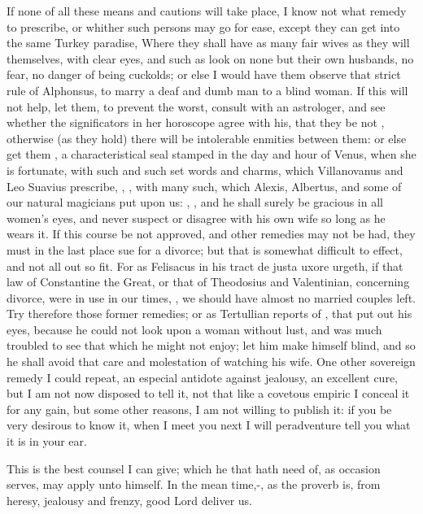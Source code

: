 If none of all these means and cautions will take place, I know not
what remedy to prescribe, or whither such persons may go for ease,
except they can get into the same Turkey paradise, Where they
shall have as many fair wives as they will themselves, with clear eyes,
and such as look on none but their own husbands, no fear, no danger of
being cuckolds; or else I would have them observe that strict rule of
Alphonsus, to marry a deaf and dumb man to a blind woman. If this
will not help, let them, to prevent the worst, consult with an
astrologer, and see whether the significators in her horoscope
agree with his, that they be not , otherwise (as they hold) there will be intolerable
enmities between them: or else get them , a
characteristical seal stamped in the day and hour of Venus, when she is
fortunate, with such and such set words and charms, which Villanovanus
and Leo Suavius prescribe, , \etc{}, with many such, which Alexis, Albertus, and some of our
natural magicians put upon us: , \etc{}, and he shall surely be gracious
in all women's eyes, and never suspect or disagree with his own wife so
long as he wears it. If this course be not approved, and other remedies
may not be had, they must in the last place sue for a divorce; but that
is somewhat difficult to effect, and not all out so fit. For as
Felisacus in his \textlatin{tract de justa uxore} urgeth, if that law of
Constantine the Great, or that of Theodosius and Valentinian,
concerning divorce, were in use in our times, , we should have almost no married
couples left. Try therefore those former remedies; or as Tertullian
reports of \Democritus, that put out his eyes, because he could
not look upon a woman without lust, and was much troubled to see that
which he might not enjoy; let him make himself blind, and so he shall
avoid that care and molestation of watching his wife. One other
sovereign remedy I could repeat, an especial antidote against jealousy,
an excellent cure, but I am not now disposed to tell it, not that like
a covetous empiric I conceal it for any gain, but some other reasons, I
am not willing to publish it: if you be very desirous to know it, when
I meet you next I will peradventure tell you what it is in your ear.

This is the best counsel I can give; which he that hath need of, as
occasion serves, may apply unto himself. In the mean time,-, as the proverb is, from heresy, jealousy
and frenzy, good Lord deliver us.
